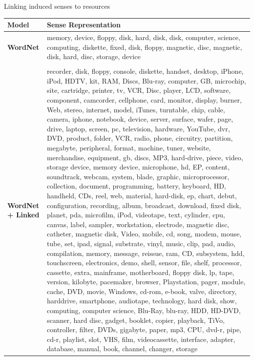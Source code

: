 \begin{frame}{Linking induced senses to resources }


\begin{table}
\tiny
\begin{tabular}{l|p{9cm}} 
\bf Model & \bf Sense Representation \\ \hline
\textbf{WordNet}  &  memory, device, floppy, disk, hard, disk, disk, computer, science, computing, diskette, fixed, disk, floppy, magnetic, disc, magnetic, disk, hard, disc,      storage, device \\ \\ \hline 
\textbf{WordNet + Linked} & recorder, disk, floppy, console, diskette, handset, desktop, iPhone, iPod, HDTV, kit, RAM, Discs, Blu-ray, computer, GB, microchip, site, cartridge,          printer, tv, VCR, Disc, player, LCD, software, component, camcorder, cellphone, card, monitor, display, burner, Web, stereo, internet, model, iTunes,         turntable, chip, cable, camera, iphone, notebook, device, server, surface, wafer, page, drive, laptop, screen, pc, television, hardware, YouTube, dvr,        DVD, product, folder, VCR, radio, phone, circuitry, partition, megabyte, peripheral, format, machine, tuner, website, merchandise, equipment, gb, discs,      MP3, hard-drive, piece, video, storage device, memory device, microphone, hd, EP, content, soundtrack, webcam, system, blade, graphic, microprocessor,        collection, document, programming, battery, keyboard, HD, handheld, CDs, reel, web, material, hard-disk, ep, chart, debut, configuration, recording,          album, broadcast, download, fixed disk, planet, pda, microfilm, iPod, videotape, text, cylinder, cpu, canvas, label, sampler, workstation, electrode,         magnetic disc, catheter, magnetic disk, Video, mobile, cd, song, modem, mouse, tube, set, ipad, signal, substrate, vinyl, music, clip, pad, audio,            compilation, memory, message, reissue, ram, CD, subsystem, hdd, touchscreen, electronics, demo, shell, sensor, file, shelf, processor, cassette, extra,       mainframe, motherboard, floppy disk, lp, tape, version, kilobyte, pacemaker, browser, Playstation, pager, module, cache, DVD, movie, Windows, cd-rom, e-book, valve, directory, harddrive, smartphone, audiotape, technology, hard disk, show, computing, computer science, Blu-Ray, blu-ray, HDD, HD-DVD,            scanner, hard disc, gadget, booklet, copier, playback, TiVo, controller, filter, DVDs, gigabyte, paper, mp3, CPU, dvd-r, pipe, cd-r, playlist, slot, VHS,     film, videocassette, interface, adapter, database, manual, book, channel, changer, storage \\ 
\end{tabular}

\end{table}

	
\end{frame}



